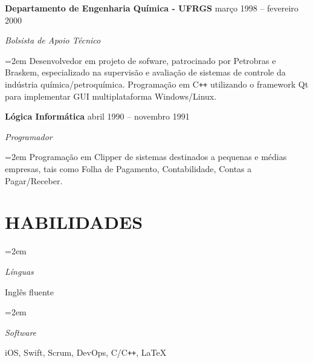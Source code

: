 \documentclass[paper=a4,fontsize=11pt]{scrartcl} %
\newlength{\spacebox}
\newcommand{\sepspace}{\vspace*{1em}}		%
\newcommand{\NewPart}[1]{\section*{\uppercase{#1}}}
\newcommand{\PersonalEntry}[2]{
		\noindent\hangindent=2em\hangafter=0 %
		\parbox{\spacebox}{        %
		\textit{#1}}		       %
		\hspace{1.5em} #2 \par}    %
\newcommand{\SkillsEntry}[2]{      %
		\noindent\hangindent=2em\hangafter=0 %
		\parbox{\spacebox}{        %
		\textit{#1}}			   %
		\hspace{1.5em} #2 \par}    %
\newcommand{\EducationEntry}[4]{
		\noindent \textbf{#1} \hfill      %
        #2 \par
		\noindent \textit{#3} \par        %
		\noindent\hangindent=2em\hangafter=0 \small #4 %
		\normalsize \par}
\newcommand{\WorkEntry}[4]{				  %
		\noindent \textbf{#1} \hfill      %
        #2 \par
		\noindent \textit{#3} \par        %
		\noindent\hangindent=2em\hangafter=0 \small #4 %
		\normalsize \par}
\begin{document}
\WorkEntry{Departamento de Engenharia Química - UFRGS}{março 1998 – fevereiro 2000}{Bolsista de Apoio Técnico}{Desenvolvedor em projeto de sofware, patrocinado por Petrobras e Braskem, especializado na supervisão e avaliação de sistemas de controle da indústria química/petroquímica. Programação em C\texttt{++} utilizando o framework Qt para implementar GUI multiplataforma Windows/Linux.}
\sepspace
\sepspace

\WorkEntry{Lógica Informática}{abril 1990 – novembro 1991}{Programador}{Programação em Clipper de sistemas destinados a pequenas e médias empresas, tais como Folha de Pagamento, Contabilidade, Contas a Pagar/Receber.}

\NewPart{Habilidades}{}

\SkillsEntry{Línguas}{Inglês fluente}

\SkillsEntry{Software}{iOS, Swift, Scrum, DevOps, C/C\texttt{++}, \LaTeX}


\end{document}
